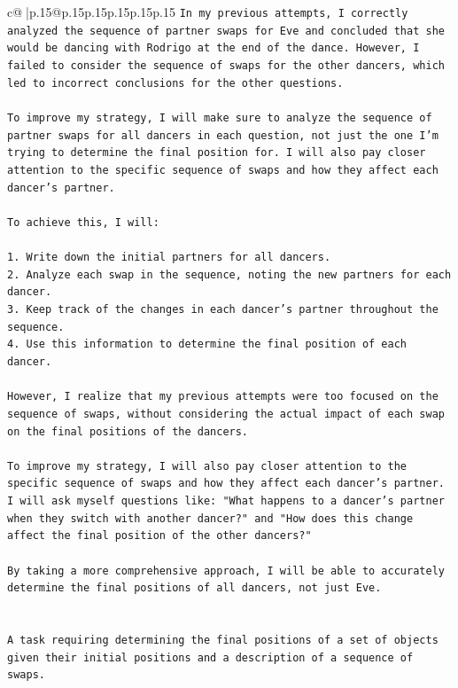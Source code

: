 \documentclass{article}
\begin{document}
{\begin{supertabular}{c@{$\;$}|p{.15\linewidth}@{}p{.15\linewidth}p{.15\linewidth}p{.15\linewidth}p{.15\linewidth}p{.15\linewidth}}
{{{\texttt{In my previous attempts, I correctly analyzed the sequence of partner swaps for Eve and concluded that she would be dancing with Rodrigo at the end of the dance. However, I failed to consider the sequence of swaps for the other dancers, which led to incorrect conclusions for the other questions.} \\
\\ 
\texttt{To improve my strategy, I will make sure to analyze the sequence of partner swaps for all dancers in each question, not just the one I'm trying to determine the final position for. I will also pay closer attention to the specific sequence of swaps and how they affect each dancer's partner.} \\
\\ 
\texttt{To achieve this, I will:} \\
\\ 
\texttt{1. Write down the initial partners for all dancers.} \\
\texttt{2. Analyze each swap in the sequence, noting the new partners for each dancer.} \\
\texttt{3. Keep track of the changes in each dancer's partner throughout the sequence.} \\
\texttt{4. Use this information to determine the final position of each dancer.} \\
\\ 
\texttt{However, I realize that my previous attempts were too focused on the sequence of swaps, without considering the actual impact of each swap on the final positions of the dancers. } \\
\\ 
\texttt{To improve my strategy, I will also pay closer attention to the specific sequence of swaps and how they affect each dancer's partner. I will ask myself questions like: "What happens to a dancer's partner when they switch with another dancer?" and "How does this change affect the final position of the other dancers?"} \\
\\ 
\texttt{By taking a more comprehensive approach, I will be able to accurately determine the final positions of all dancers, not just Eve.} \\
\\ 
\\ 
\texttt{A task requiring determining the final positions of a set of objects given their initial positions and a description of a sequence of swaps.} \\
\\ 
}}}
\end{supertabular}}
\end{document}
